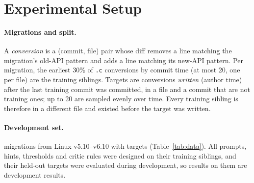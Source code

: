 \section{Experimental Setup}
\label{sec:setup}

\begin{table}[t]
\centering
\caption{Data. \emph{New API}: first commit that adds the new API under \texttt{include/} (test set only; all
after the models' training cutoffs). \emph{Train}: training siblings. \emph{Buildable}: targets whose original file
compiles on x86\_64 \texttt{allmodconfig}; the denominator of every success count.}
\label{tab:data}
\footnotesize

\end{table}

\begin{table}[t]
\centering
\caption{Test set: held-out conversions solved (output matches the human fix exactly or as a complete subset, and
compiles). Local models: mean over three seeds, [min--max] where the seeds differ. \textsc{one-shot}: one rule from
the plain examples; \textsc{full}: the complete framework. $^\dagger$A frontier LLM agent that may have seen these
migrations during training; a reference point, not a like-for-like competitor.}
\label{tab:test}
\footnotesize
\setlength{\tabcolsep}{4pt}

\end{table}

\paragraph{Migrations and split.} A \emph{conversion} is a (commit, file) pair whose diff removes a line matching the
migration's old-API pattern and adds a line matching its new-API pattern. Per migration, the earliest 30\% of
\texttt{.c} conversions by commit time (at most 20, one per file) are the training siblings. Targets are conversions
\emph{written} (author time) after the last training commit was committed, in a file and a commit that are not
training ones; up to 20 are sampled evenly over time. Every training sibling is therefore in a different file and
existed before the target was written.

\paragraph{Development set.} \devMigrations{} migrations from Linux v5.10--v6.10 with \devTargets{} targets
(Table~\ref{tab:data}). All prompts, hints, thresholds and critic rules were designed on their training siblings, and their
held-out targets were evaluated during development, so results on them are development results.


